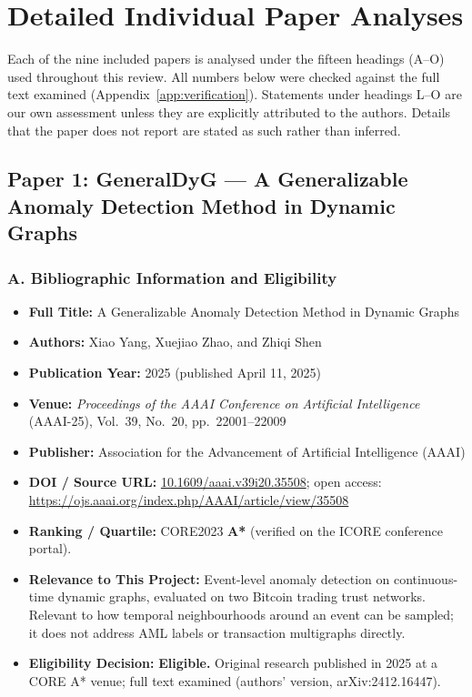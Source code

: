 \documentclass[11pt,a4paper]{article}
\begin{document}
\section{Detailed Individual Paper Analyses}
\label{sec:individual_analyses}

Each of the nine included papers is analysed under the fifteen headings (A--O) used throughout this review. All numbers below were checked against the full text examined (Appendix~\ref{app:verification}). Statements under headings L--O are our own assessment unless they are explicitly attributed to the authors. Details that the paper does not report are stated as such rather than inferred.

\subsection{Paper 1: GeneralDyG --- A Generalizable Anomaly Detection Method in Dynamic Graphs}
\label{sec:p1_generaldyg}

\subsubsection*{A. Bibliographic Information and Eligibility}
\begin{itemize}[leftmargin=*]
    \item \textbf{Full Title:} A Generalizable Anomaly Detection Method in Dynamic Graphs
    \item \textbf{Authors:} Xiao Yang, Xuejiao Zhao, and Zhiqi Shen
    \item \textbf{Publication Year:} 2025 (published April 11, 2025)
    \item \textbf{Venue:} \textit{Proceedings of the AAAI Conference on Artificial Intelligence} (AAAI-25), Vol.~39, No.~20, pp.~22001--22009
    \item \textbf{Publisher:} Association for the Advancement of Artificial Intelligence (AAAI)
    \item \textbf{DOI / Source URL:} \href{https://doi.org/10.1609/aaai.v39i20.35508}{10.1609/aaai.v39i20.35508}; open access: \url{https://ojs.aaai.org/index.php/AAAI/article/view/35508}
    \item \textbf{Ranking / Quartile:} CORE2023 \textbf{A*} (verified on the ICORE conference portal).
    \item \textbf{Relevance to This Project:} Event-level anomaly detection on continuous-time dynamic graphs, evaluated on two Bitcoin trading trust networks. Relevant to how temporal neighbourhoods around an event can be sampled; it does not address AML labels or transaction multigraphs directly.
    \item \textbf{Eligibility Decision:} \textbf{Eligible.} Original research published in 2025 at a CORE A* venue; full text examined (authors' version, arXiv:2412.16447).
\end{itemize}
\end{document}
